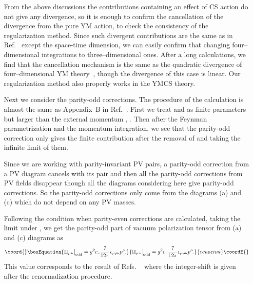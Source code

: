 \documentclass[a4paper,12pt]{article}
\begin{document}
%
From the above discussions
the contributions containing an effect of CS action
do not give any divergence,
so it is enough to confirm
the cancellation of the divergence from the pure YM action,
to check the consistency of the regularization method.
%
Since such divergent contributions are the same as in Ref.~\cite{Nittoh:2000it}
except the space-time dimension,
we can easily confirm that
changing four--dimensional integrations to three--dimensional ones.
%
After a long calculations, we find that
the cancellation mechanism is the same as the quadratic divergence
of four--dimensional YM theory~\cite{Nittoh:2000it},
though the divergence of this case is linear.
%
Our regularization method also properly works in the YMCS theory.









Next we consider the parity-odd corrections.
%
The procedure of the calculation is almost the same as
Appendix~B in Ref.~\cite{Nittoh:2000it}.
%
First we treat \myHighlight{$\mu$}\coordHE{} and \myHighlight{$\Lambda$}\coordHE{} as finite parameters
but larger than the external momentum \coordHE{}, \coordHE{}.
%
Then after the Feynman parametrization and the momentum integration,
we see that the parity-odd correction only gives the finite contribution
after the removal of \myHighlight{$\mu$}\coordHE{} and \myHighlight{$\Lambda$}\coordHE{}
taking the infinite limit of them.


Since we are working with parity-invariant PV pairs,
a parity-odd correction from a PV diagram cancels with its pair
and then all the parity-odd corrections from PV fields
disappear
though all the diagrams considering here give parity-odd corrections.
%
So the parity-odd corrections only come from the diagrams (a) and (c)
which do not depend on any PV masses.


Following the condition when parity-even corrections are calculated,
taking the limit \myHighlight{$\mu, \Lambda \rightarrow \infty$}\coordHE{} under 
\coordHE{},
we get the parity-odd part of vacuum polarization tensor
from (a) and (c) diagrams as
%
\begin{equation}\coord{}\boxEquation{
\Pi_{\mu\nu}\big|_\mathrm{odd}=
g^2c_v\frac{7}{12\pi}\epsilon_{\mu\rho\nu}p^\rho.
\label{eq:pi-odd mu << Lambda}
}{
\Pi_{\mu\nu}\big|_\mathrm{odd}=
g^2c_v\frac{7}{12\pi}\epsilon_{\mu\rho\nu}p^\rho.
}{ecuacion}\coordE{}\end{equation}
%
This value corresponds to the result of Refs.%
~\cite{Giavarini:1992xz,Giavarini:1993xb}
where the integer-shift is given
after the renormalization procedure.
\end{document}

